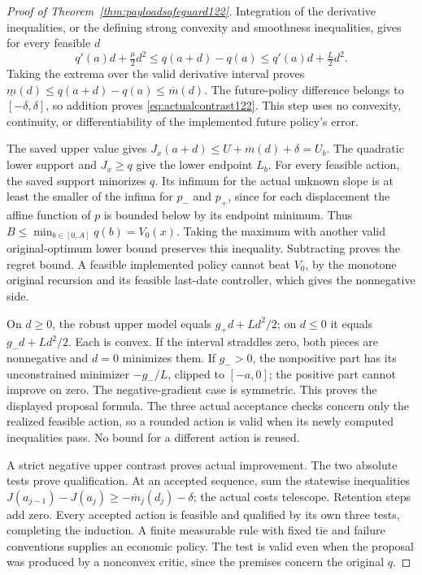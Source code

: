 \begin{proof}[Proof of Theorem~\ref{thm:payloadsafeguard122}]
Integration of the derivative inequalities, or the defining strong
convexity and smoothness inequalities, gives for every feasible $d$
\[
 q'(a)d+\tfrac\mu2d^2
 \le q(a+d)-q(a)
 \le q'(a)d+\tfrac L2d^2.
\]
Taking the extrema over the valid derivative interval proves
$\underline m(d)\le q(a+d)-q(a)\le\overline m(d)$.
The future-policy difference belongs to $[-\delta,\delta]$,
so addition proves \eqref{eq:actualcontrast122}. This step uses no
convexity, continuity, or differentiability of the implemented future
policy's error.

The saved upper value gives
$J_x(a+d)\le U+\overline m(d)+\delta=U_b$.
The quadratic lower support and $J_x\ge q$ give the lower endpoint
$L_b$. For every feasible action, the saved support minorizes $q$.
Its infimum for the actual unknown slope is at least the smaller of
the infima for $p_-$ and $p_+$, since for each displacement the affine
function of $p$ is bounded below by its endpoint minimum. Thus
$B\le\min_{b\in[0,A]}q(b)=V_0(x)$. Taking the maximum with another
valid original-optimum lower bound preserves this inequality.
Subtracting proves the regret bound. A feasible implemented policy
cannot beat $V_0$, by the monotone original recursion and its feasible
last-date controller, which gives the nonnegative side.

On $d\ge0$, the robust upper model equals
$g_+d+Ld^2/2$; on $d\le0$ it equals
$g_-d+Ld^2/2$. Each is convex. If the interval straddles zero, both
pieces are nonnegative and $d=0$ minimizes them. If $g_->0$, the
nonpositive part has its unconstrained minimizer $-g_-/L$, clipped
to $[-a,0]$; the positive part cannot improve on zero.
The negative-gradient case is symmetric. This proves the displayed
proposal formula. The three actual acceptance checks concern only the
realized feasible action, so a rounded action is valid when its newly
computed inequalities pass. No bound for a different action is reused.

A strict negative upper contrast proves actual improvement. The two
absolute tests prove qualification. At an accepted sequence, sum the
statewise inequalities $J(a_{j-1})-J(a_j)\ge
-\overline m_j(d_j)-\delta$; the actual costs telescope. Retention
steps add zero. Every accepted action is feasible and qualified by its
own three tests, completing the induction. A finite measurable rule
with fixed tie and failure conventions supplies an economic policy.
The test is valid even when the proposal was produced by a nonconvex
critic, since the premises concern the original $q$.


\end{proof}
